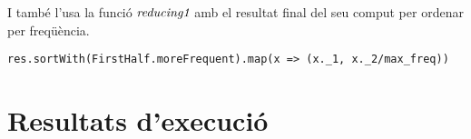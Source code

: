 \documentclass{report}
\begin{document}
I també l'usa la funció $ \emph{reducing1} $ amb el resultat final del seu comput per ordenar per freqüència.

\begin{lstlisting}[style=scalaHighlight]
    res.sortWith(FirstHalf.moreFrequent).map(x => (x._1, x._2/max_freq))
\end{lstlisting}

\chapter{Resultats d'execució}
\end{document}
